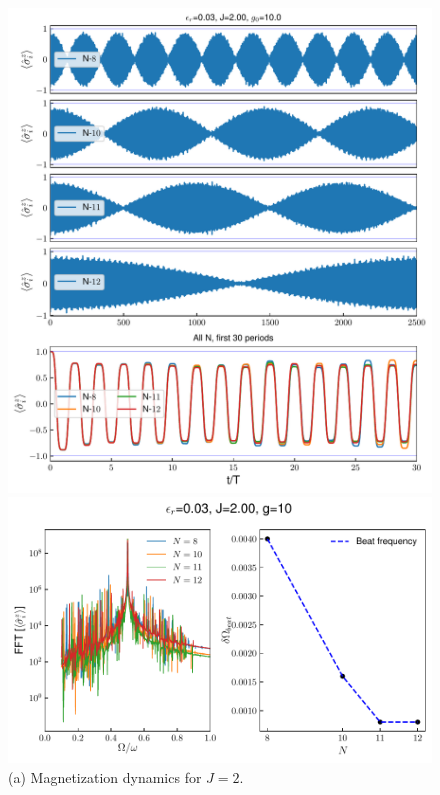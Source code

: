 \documentclass[a4paper, 11pt]{article}
\begin{document}
\begin{figure}[h!]
    \centering
    \begin{minipage}[t]{0.48\textwidth} 
        \centering
        \includegraphics[width=\textwidth]{figs/time_mag_epsilon_r0.03_J2.00_g10.0_allN.pdf}
        \caption*{(a) Magnetization dynamics for $J = 2$.}
    \end{minipage}
    \hfill
    \begin{minipage}[t]{0.48\textwidth}
        \centering
        \includegraphics[width=\textwidth]{figs/DTC_mag_fft_beat_er=0.03_J=2_g=10.0.pdf}

\end{minipage}
\end{figure}
\end{document}
